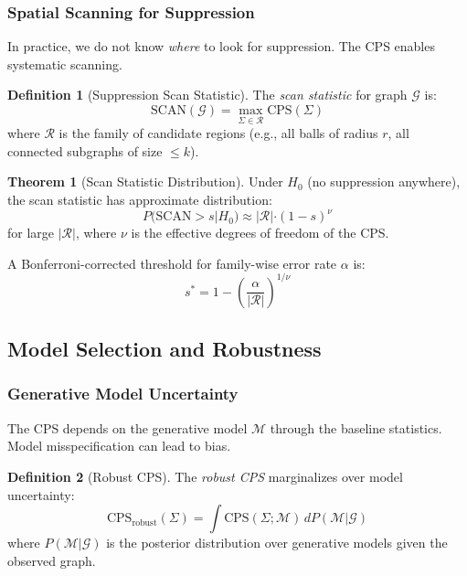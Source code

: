 \documentclass[12pt,a4paper]{article}
\theoremstyle{definition}
\newtheorem{definition}{Definition}[section]
\newtheorem{theorem}{Theorem}[section]
\theoremstyle{remark}
\newcommand{\Graph}{\mathcal{G}}         %
\begin{document}
\subsubsection{Spatial Scanning for Suppression}

In practice, we do not know \emph{where} to look for suppression. The CPS enables systematic scanning.

\begin{definition}[Suppression Scan Statistic]
The \emph{scan statistic} for graph $\Graph$ is:
\begin{equation}
    \text{SCAN}(\Graph) = \max_{\Sigma \in \mathcal{R}} \text{CPS}(\Sigma)
\end{equation}
where $\mathcal{R}$ is the family of candidate regions (e.g., all balls of radius $r$, all connected subgraphs of size $\leq k$).
\end{definition}

\begin{theorem}[Scan Statistic Distribution]
\label{thm:scan}
Under $H_0$ (no suppression anywhere), the scan statistic has approximate distribution:
\begin{equation}
    P(\text{SCAN} > s | H_0) \approx |\mathcal{R}| \cdot (1 - s)^{\nu}
\end{equation}
for large $|\mathcal{R}|$, where $\nu$ is the effective degrees of freedom of the CPS.

A Bonferroni-corrected threshold for family-wise error rate $\alpha$ is:
\begin{equation}
    s^* = 1 - \left( \frac{\alpha}{|\mathcal{R}|} \right)^{1/\nu}
\end{equation}
\end{theorem}

\subsection{Model Selection and Robustness}

\subsubsection{Generative Model Uncertainty}

The CPS depends on the generative model $\mathcal{M}$ through the baseline statistics. Model misspecification can lead to bias.

\begin{definition}[Robust CPS]
The \emph{robust CPS} marginalizes over model uncertainty:
\begin{equation}
    \text{CPS}_{\text{robust}}(\Sigma) = \int \text{CPS}(\Sigma; \mathcal{M}) \, dP(\mathcal{M} | \Graph)
\end{equation}
where $P(\mathcal{M} | \Graph)$ is the posterior distribution over generative models given the observed graph.
\end{definition}
\end{document}
